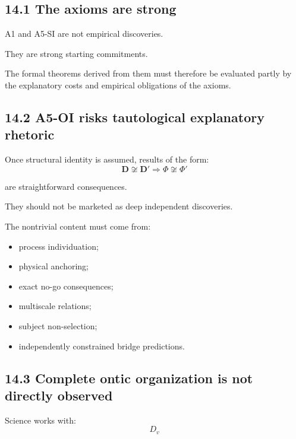 \documentclass[
  11pt,
  a4paper,
]{article}
\providecommand{\tightlist}{%
  \setlength{\itemsep}{0pt}\setlength{\parskip}{0pt}}
\begin{document}
\hypertarget{the-axioms-are-strong}{%
\subsection{14.1 The axioms are strong}\label{the-axioms-are-strong}}

A1 and A5-SI are not empirical discoveries.

They are strong starting commitments.

The formal theorems derived from them must therefore be evaluated partly
by the explanatory costs and empirical obligations of the axioms.

\hypertarget{a5-oi-risks-tautological-explanatory-rhetoric}{%
\subsection{14.2 A5-OI risks tautological explanatory
rhetoric}\label{a5-oi-risks-tautological-explanatory-rhetoric}}

Once structural identity is assumed, results of the form:
\nopagebreak[4]
\[
\mathbf D\not\cong\mathbf D'
\Rightarrow
\Phi\not\cong\Phi'
\]

are straightforward consequences.

They should not be marketed as deep independent discoveries.

The nontrivial content must come from:

\begin{itemize}
\tightlist
\item
  process individuation;
\item
  physical anchoring;
\item
  exact no-go consequences;
\item
  multiscale relations;
\item
  subject non-selection;
\item
  independently constrained bridge predictions.
\end{itemize}

\hypertarget{complete-ontic-organization-is-not-directly-observed}{%
\subsection{14.3 Complete ontic organization is not directly
observed}\label{complete-ontic-organization-is-not-directly-observed}}

Science works with:
\nopagebreak[4]
\[
D_v
\]
\end{document}
